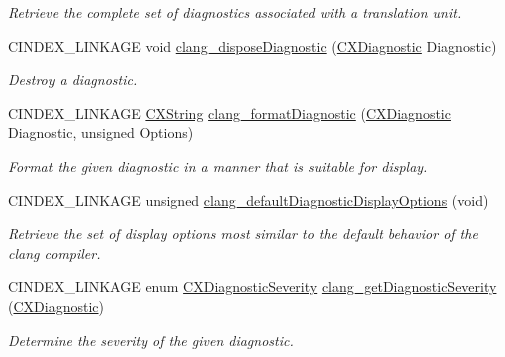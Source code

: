 \begin{DoxyCompactItemize}
\begin{DoxyCompactList}\small\item\em Retrieve the complete set of diagnostics associated with a translation unit. \end{DoxyCompactList}\item 
\mbox{\label{group__CINDEX__DIAG_ga07061e0ad7665b7c5ee7253cd1bf4a5c}} 
C\+I\+N\+D\+E\+X\+\_\+\+L\+I\+N\+K\+A\+GE void \mbox{\hyperlink{group__CINDEX__DIAG_ga07061e0ad7665b7c5ee7253cd1bf4a5c}{clang\+\_\+dispose\+Diagnostic}} (\mbox{\hyperlink{group__CINDEX__DIAG_ga44bb8aba7c40590ad25d1763c4fbff7f}{C\+X\+Diagnostic}} Diagnostic)
\begin{DoxyCompactList}\small\item\em Destroy a diagnostic. \end{DoxyCompactList}\item 
C\+I\+N\+D\+E\+X\+\_\+\+L\+I\+N\+K\+A\+GE \mbox{\hyperlink{structCXString}{C\+X\+String}} \mbox{\hyperlink{group__CINDEX__DIAG_ga455234ab6de0ca12c9ea36f8874060e8}{clang\+\_\+format\+Diagnostic}} (\mbox{\hyperlink{group__CINDEX__DIAG_ga44bb8aba7c40590ad25d1763c4fbff7f}{C\+X\+Diagnostic}} Diagnostic, unsigned Options)
\begin{DoxyCompactList}\small\item\em Format the given diagnostic in a manner that is suitable for display. \end{DoxyCompactList}\item 
C\+I\+N\+D\+E\+X\+\_\+\+L\+I\+N\+K\+A\+GE unsigned \mbox{\hyperlink{group__CINDEX__DIAG_ga5fcf910792541399efd63c62042ce353}{clang\+\_\+default\+Diagnostic\+Display\+Options}} (void)
\begin{DoxyCompactList}\small\item\em Retrieve the set of display options most similar to the default behavior of the clang compiler. \end{DoxyCompactList}\item 
\mbox{\label{group__CINDEX__DIAG_gaff14261578eb9a2b02084f0cc6b95f9a}} 
C\+I\+N\+D\+E\+X\+\_\+\+L\+I\+N\+K\+A\+GE enum \mbox{\hyperlink{group__CINDEX__DIAG_gabff210a02d448bf64e8aee79b2241370}{C\+X\+Diagnostic\+Severity}} \mbox{\hyperlink{group__CINDEX__DIAG_gaff14261578eb9a2b02084f0cc6b95f9a}{clang\+\_\+get\+Diagnostic\+Severity}} (\mbox{\hyperlink{group__CINDEX__DIAG_ga44bb8aba7c40590ad25d1763c4fbff7f}{C\+X\+Diagnostic}})
\begin{DoxyCompactList}\small\item\em Determine the severity of the given diagnostic. \end{DoxyCompactList}\item 

\end{DoxyCompactItemize}
